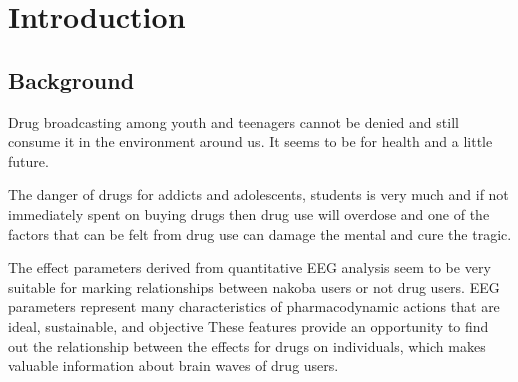 \chapter{Introduction}
\section{Background}
Drug broadcasting among youth and teenagers cannot be denied and still consume it in the environment around us. It seems to be for health and a little future. \cite{wagner2016using}
\par
The danger of drugs for addicts and adolescents, students is very much and if not immediately spent on buying drugs then drug use will overdose and one of the factors that can be felt from drug use can damage the mental and cure the tragic. \cite{warnock2018life}
\par
The effect parameters derived from quantitative EEG analysis seem to be very suitable for marking relationships between nakoba users or not drug users. EEG parameters represent many characteristics of pharmacodynamic actions that are ideal, sustainable, and objective These features provide an opportunity to find out the relationship between the effects for drugs on individuals, which makes valuable information about brain waves of drug users.\cite{mandema1992electroencephalogram}
\par
